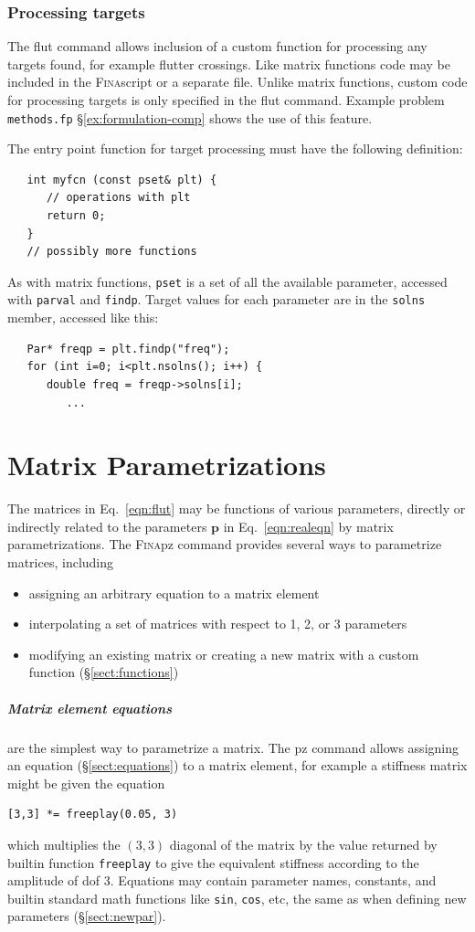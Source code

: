 \documentclass[10pt,openany,twoside]{book}
\numberwithin{equation}{section}   %
\newcommand{\Cmd}[1]{{\sf #1}}
\newcommand{\Code}[1]{{\small\tt #1}}
\newcommand{\Fina}{{\normalfont\scshape Fina\:}}
\newcommand{\Vector}[1]{\boldsymbol{#1}}
\newcommand{\Sectref}[1]{\S\ref{#1}}
\newcommand{\Eqn}[1]{Eq.\ \ref{#1}}
\begin{document}
\subsubsection{Processing targets}\label{sect:target-proc}
The \Cmd{flut} command allows inclusion of a custom function for processing
any targets found, for example flutter crossings. Like matrix functions code
may be included in the \Fina script or a separate file. Unlike matrix
functions, custom code for processing targets is only specified in the
\Cmd{flut} command.
Example problem \Code{methods.fp} \Sectref{ex:formulation-comp} shows the
use of this feature.

The entry point function for target processing must have the following
definition:
\begin{lstlisting}
   int myfcn (const pset& plt) {
      // operations with plt
      return 0;
   }
   // possibly more functions
\end{lstlisting}
As with matrix functions, \Code{pset} is a set of all the available
parameter, accessed with \Code{parval} and \Code{findp}.
Target values for each parameter are in the \Code{solns} member,
accessed like this:
\begin{lstlisting}
   Par* freqp = plt.findp("freq");
   for (int i=0; i<plt.nsolns(); i++) {
      double freq = freqp->solns[i];
         ...
\end{lstlisting}


\section{Matrix Parametrizations}\label{sect:pz}
The matrices in \Eqn{eqn:flut} may be functions of various parameters, directly
or indirectly related to the parameters $\Vector{p}$ in \Eqn{eqn:realeqn} by
matrix parametrizations.
The \Fina \Cmd{pz} command provides several ways to
parametrize matrices, including
\begin{itemize}
\item assigning an arbitrary equation to a matrix element
\item interpolating a set of matrices with respect to 1, 2, or 3 parameters
\item modifying an existing matrix or creating a new matrix
      with a custom function (\Sectref{sect:functions})
\end{itemize}

\subparagraph{Matrix element equations} are the simplest way
to parametrize a matrix. The \Cmd{pz} command allows assigning
an equation (\Sectref{sect:equations}) to a matrix element,
for example a stiffness matrix might be given the equation
\begin{lstlisting}
[3,3] *= freeplay(0.05, 3)
\end{lstlisting}
which multiplies the $(3,3)$ diagonal of the matrix by the value
returned by builtin function \Code{freeplay} to give
the equivalent stiffness according to the amplitude of dof 3.
Equations may contain parameter names, constants, and builtin
standard math functions like \Code{sin}, \Code{cos}, etc,
the same as when defining new parameters (\Sectref{sect:newpar}).
\end{document}
